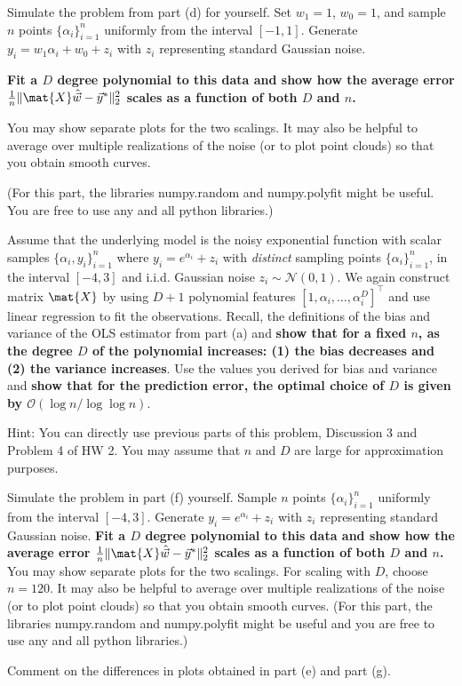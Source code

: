 \documentclass[preview]{standalone}
\begin{document}
\begin{Parts}
\Part Simulate the problem from part (d) for yourself.
Set $w_1 = 1$, $w_0 = 1$, and sample $n$ points $\{\alpha_i\}_{i=1}^n$ uniformly from
the interval $[-1,1]$. Generate $y_i = w_1 \alpha_i + w_0 + z_i$ with $z_i$
representing standard Gaussian noise.

{\bf Fit a $D$ degree polynomial to this data and show how the average error
$\frac{1}{n} \| \mat{X} \hat{\vec{w}} - \vec{y}^* \|_2^2$ scales as a function of
both $D$ and $n$.}

You may show separate plots for the two scalings. It may also be helpful
to average over multiple realizations of the noise (or to plot point
clouds) so that you obtain smooth curves.

(For this part, the libraries numpy.random and numpy.polyfit might be useful.
You are free to use any and all python libraries.)



\Part Assume that the underlying model is the noisy exponential function
with scalar samples $\{\alpha_i, y_i\}_{i=1}^n$ where  $y_i = e^{\alpha_i} + z_i$
with  \emph{distinct} sampling points $\{\alpha_i\}_{i=1}^n$, in the interval $[-4,3]$
and i.i.d. Gaussian noise $z_i \sim \mathcal{N}(0, 1)$.
We again construct matrix $\mat{X}$ by using $D+1$ polynomial features $[1, \alpha_i, \ldots, \alpha_i^D]^\top$
and use linear regression to fit the observations.
Recall, the definitions of the bias and variance of the OLS estimator from part (a)
and {\bf show that for a fixed $n$, as the degree $D$ of the polynomial
increases: (1) the bias decreases and (2) the variance increases}.
Use the values you derived for bias and variance and {\bf show that for the
prediction error, the optimal choice of $D$ is given by
$\mathcal{O}(\log n/\log\log n)$}.

Hint: You can directly use previous parts of this problem, Discussion 3 and Problem 4 of HW 2.
You may assume that $n$ and $D$ are large for approximation purposes.




\Part Simulate the problem in part (f) yourself.
Sample $n$ points $\{\alpha_i\}_{i=1}^n$ uniformly from
the interval $[-4, 3]$. Generate $y_i = e^{\alpha_i} + z_i$ with $z_i$
representing standard Gaussian noise.
{\bf Fit a $D$ degree polynomial to this data and show how the average error
$\frac{1}{n} \| \mat{X} \hat{\vec{w}} - \vec{y}^* \|_2^2$ scales as a function of both $D$ and $n$.}
You may show separate plots for the two scalings.
For scaling with $D$, choose $n = 120$.
It may also be helpful to average over multiple realizations of the noise (or to plot point
clouds) so that you obtain smooth curves.
(For this part, the libraries numpy.random and numpy.polyfit might be useful
and you are free to use any and all python libraries.)



\Part Comment on the differences in plots obtained in part (e) and part (g).


\end{Parts}
\end{document}
